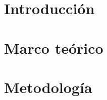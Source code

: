 \documentclass[12pt, spanish]{report}
\begin{document}
	\setlength{\parskip}{0.6em}
	\begin{justify}
	\chapter{Introducción}
	
	
	\chapter{Marco teórico}
	
	
	\chapter{Metodología}
	
	
	\titlespacing*{\chapter}{0pt}{-50pt}{20pt}

	
	
	\end{justify}
	

	
\end{document}

